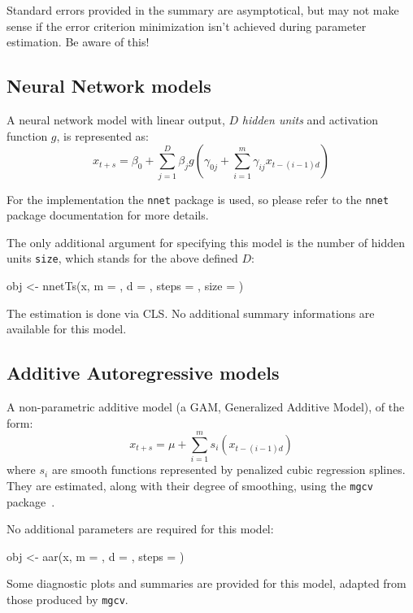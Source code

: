 \documentclass[a4paper]{article}
\begin{document}
Standard errors provided in the summary are asymptotical, but may not make sense if the error criterion minimization isn't achieved during parameter estimation. Be aware of this!

\subsection{Neural Network models}
A neural network model with linear output, $D$ \emph{hidden units} and activation function $g$, is represented as:
\begin{equation}
x_{t+s} = \beta_0 + \sum_{j=1}^D \beta_j g( \gamma_{0j} + \sum_{i=1}^{m} \gamma_{ij} x_{t-(i-1) d} )
\end{equation}

For the implementation the \texttt{nnet} package is used, so please refer to the \texttt{nnet} package documentation for more details.

The only additional argument for specifying this model is the number of hidden units \texttt{size}, which stands for the above defined $D$:
\begin{Schunk}
\begin{Sinput}
 obj <- nnetTs(x, m = , d = , steps = , size = )
\end{Sinput}
\end{Schunk}

The estimation is done via CLS. No additional summary informations are available for this model.

\subsection{Additive Autoregressive models}
A non-parametric additive model (a GAM, Generalized Additive Model), of the form:
\begin{equation}
x_{t+s} = \mu + \sum_{i=1}^{m} s_i ( x_{t-(i-1) d} )
\end{equation}
where $s_i$ are smooth functions represented by penalized cubic regression splines. They are estimated, along with their degree of smoothing, using the \texttt{mgcv} package~\cite{Wood2004}.

No additional parameters are required for this model:
\begin{Schunk}
\begin{Sinput}
 obj <- aar(x, m = , d = , steps = )
\end{Sinput}
\end{Schunk}

Some diagnostic plots and summaries are provided for this model, adapted from those produced by \texttt{mgcv}.
\end{document}
